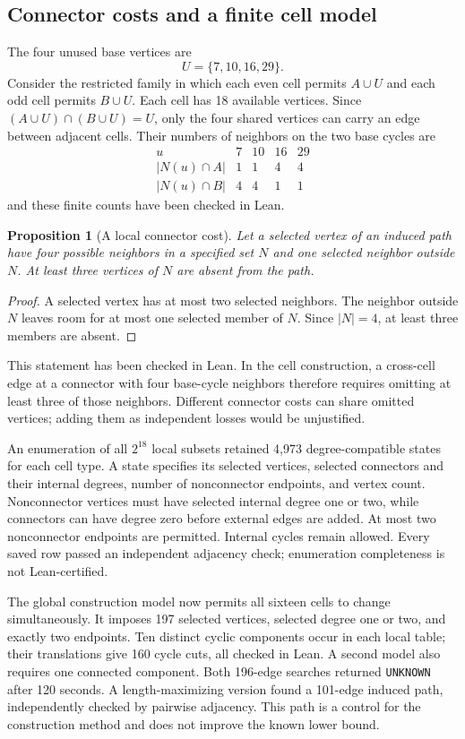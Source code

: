 \documentclass[11pt,a4paper]{article}
\newtheorem{proposition}[theorem]{Proposition}
\theoremstyle{definition}
\theoremstyle{remark}
\begin{document}
\subsection{Connector costs and a finite cell model}
The four unused base vertices are
\[
U=\{7,10,16,29\}.
\]
Consider the restricted family in which each even cell permits $A\cup U$ and each odd cell permits $B\cup U$. Each cell has 18 available vertices. Since $(A\cup U)\cap(B\cup U)=U$, only the four shared vertices can carry an edge between adjacent cells. Their numbers of neighbors on the two base cycles are
\[
\begin{array}{c|rrrr}
u&7&10&16&29\\\hline
|N(u)\cap A|&1&1&4&4\\
|N(u)\cap B|&4&4&1&1
\end{array}
\]
and these finite counts have been checked in Lean.

\begin{proposition}[A local connector cost]
Let a selected vertex of an induced path have four possible neighbors in a specified set $N$ and one selected neighbor outside $N$. At least three vertices of $N$ are absent from the path.
\end{proposition}
\begin{proof}
A selected vertex has at most two selected neighbors. The neighbor outside $N$ leaves room for at most one selected member of $N$. Since $|N|=4$, at least three members are absent.
\end{proof}
This statement has been checked in Lean. In the cell construction, a cross-cell edge at a connector with four base-cycle neighbors therefore requires omitting at least three of those neighbors. Different connector costs can share omitted vertices; adding them as independent losses would be unjustified.

An enumeration of all $2^{18}$ local subsets retained 4,973 degree-compatible states for each cell type. A state specifies its selected vertices, selected connectors and their internal degrees, number of nonconnector endpoints, and vertex count. Nonconnector vertices must have selected internal degree one or two, while connectors can have degree zero before external edges are added. At most two nonconnector endpoints are permitted. Internal cycles remain allowed. Every saved row passed an independent adjacency check; enumeration completeness is not Lean-certified.

The global construction model now permits all sixteen cells to change simultaneously. It imposes 197 selected vertices, selected degree one or two, and exactly two endpoints. Ten distinct cyclic components occur in each local table; their translations give 160 cycle cuts, all checked in Lean. A second model also requires one connected component. Both 196-edge searches returned \texttt{UNKNOWN} after 120 seconds. A length-maximizing version found a 101-edge induced path, independently checked by pairwise adjacency. This path is a control for the construction method and does not improve the known lower bound.
\end{document}
